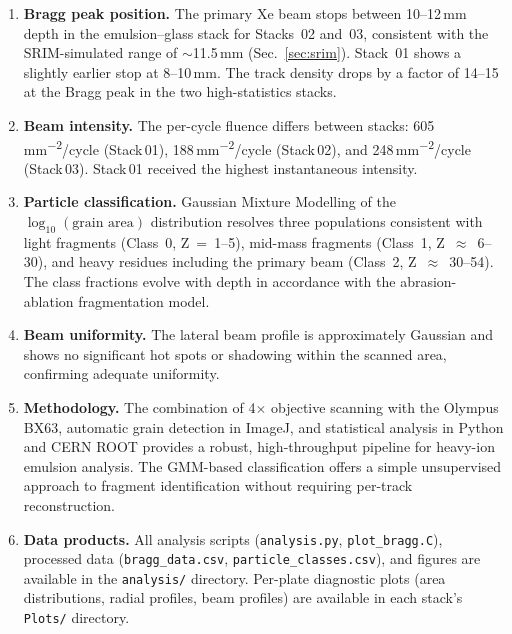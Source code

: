 \documentclass[12pt,a4paper]{article}
\begin{document}
\begin{enumerate}
  \item \textbf{Bragg peak position.} The primary Xe beam stops between
        10--12\,mm depth in the emulsion--glass stack for Stacks~02
        and~03, consistent with the SRIM-simulated range of
        $\sim$11.5\,mm (Sec.~\ref{sec:srim}). Stack~01 shows a
        slightly earlier stop at 8--10\,mm. The track density drops by
        a factor of 14--15 at the Bragg peak in the two
        high-statistics stacks.

  \item \textbf{Beam intensity.} The per-cycle fluence differs between
        stacks: 605\,\si{\mm^{-2}}/cycle (Stack\,01),
        188\,\si{\mm^{-2}}/cycle (Stack\,02), and
        248\,\si{\mm^{-2}}/cycle (Stack\,03). Stack\,01 received the
        highest instantaneous intensity.

  \item \textbf{Particle classification.} Gaussian Mixture Modelling
        of the $\log_{10}(\text{grain area})$ distribution resolves
        three populations consistent with light fragments (Class~0,
        Z~=~1--5), mid-mass fragments (Class~1, Z~$\approx$~6--30),
        and heavy residues including the primary beam (Class~2,
        Z~$\approx$~30--54). The class fractions evolve with depth in
        accordance with the abrasion-ablation fragmentation model.

  \item \textbf{Beam uniformity.} The lateral beam profile is
        approximately Gaussian and shows no significant hot spots or
        shadowing within the scanned area, confirming adequate
        uniformity.

  \item \textbf{Methodology.} The combination of 4$\times$ objective
        scanning with the Olympus BX63, automatic grain detection in
        ImageJ, and statistical analysis in Python and CERN ROOT
        provides a robust, high-throughput pipeline for heavy-ion
        emulsion analysis. The GMM-based classification offers a
        simple unsupervised approach to fragment identification
        without requiring per-track reconstruction.

  \item \textbf{Data products.} All analysis scripts
        (\texttt{analysis.py}, \texttt{plot\_bragg.C}),
        processed data (\texttt{bragg\_data.csv},
        \texttt{particle\_classes.csv}), and figures are available
        in the \texttt{analysis/} directory. Per-plate diagnostic
        plots (area distributions, radial profiles, beam profiles)
        are available in each stack's \texttt{Plots/} directory.
\end{enumerate}
\end{document}
